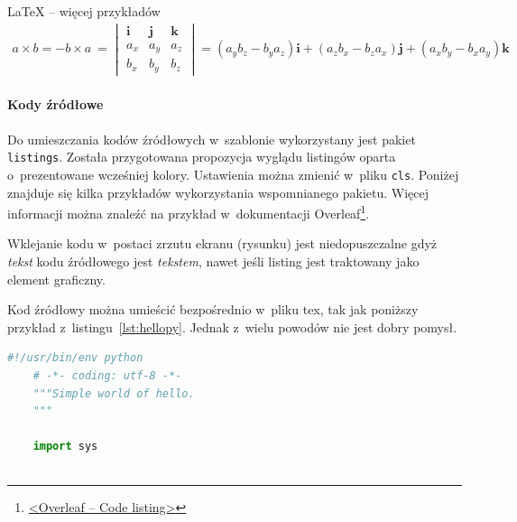 \begin{easyappendix}{\LaTeX{} -- więcej przykładów}
\begin{gather}
	a \times b = -b \times a~= 
	\begin{vmatrix}
		\pmb{i}    &     \pmb{j}      &      \pmb{k}    \\
		a_x        &     a_y          &      a_z        \\
		b_x        &     b_y          &      b_z        
	\end{vmatrix}
	= \left(a_y b_z - b_y a_z \right)\pmb{i} 
	+ \left(a_z b_x - b_z a_x \right)\pmb{j} 
	+ \left(a_x b_y - b_x a_y \right)\pmb{k} 
\end{gather}


\paragraph{Kody źródłowe}
Do umieszczania kodów źródłowych w~szablonie wykorzystany jest pakiet \texttt{listings}. Została przygotowana propozycja wyglądu listingów oparta o~prezentowane wcześniej kolory. Ustawienia można zmienić w~pliku \texttt{cls}. Poniżej znajduje się kilka przykładów wykorzystania wspomnianego pakietu. Więcej informacji można znaleźć na przykład w~dokumentacji Overleaf\footnote{\href{https://www.overleaf.com/learn/latex/code_listing}{<Overleaf -- Code listing>}}.

Wklejanie kodu w~postaci zrzutu ekranu (rysunku) jest niedopuszczalne gdyż \textit{tekst} kodu źródłowego jest \textit{tekstem}, nawet jeśli listing jest traktowany jako element graficzny.

Kod źródłowy można umieścić bezpośrednio w~pliku tex, tak jak poniższy przykład z~listingu~\ref{lst:hellopy}. Jednak z~wielu powodów nie jest dobry pomysł.

\begin{lstlisting}[language=Python,
	caption={Prosty skrypt w~języku Python},
	label={lst:hellopy}]
	#!/usr/bin/env python
	# -*- coding: utf-8 -*-
	"""Simple world of hello.
	"""
	
	import sys
	

\end{lstlisting}
\end{easyappendix}
